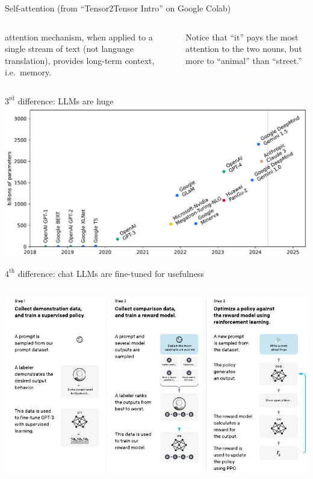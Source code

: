 \documentclass[aspectratio=169]{beamer}
\begin{document}
\begin{frame}{Self-attention (from ``Tensor2Tensor Intro'' on Google Colab)}
\begin{columns}
attention mechanism, when applied to a single stream of text (not language translation), provides long-term context, i.e.\ memory.

\large
\vspace{0.5 cm}
Notice that ``it'' pays the most attention to the two nouns, but more to ``animal'' than ``street.''
\end{columns}
\end{frame}

\begin{frame}{$3^{\mbox{rd}}$ difference: LLMs are huge}
\vspace{0.5 cm}
\includegraphics[width=\linewidth]{llm-number-of-parameters.pdf}
\end{frame}

\begin{frame}{$4^{\mbox{th}}$ difference: chat LLMs are fine-tuned for usefulness}
\vspace{0.5 cm}
\begin{columns}
\includegraphics[width=\linewidth]{fine-tuning-for-chat.pdf}
\end{columns}
\end{frame}
\end{document}
